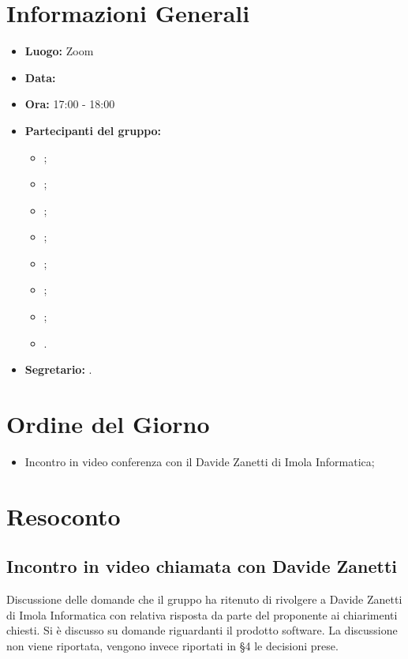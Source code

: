 \section{Informazioni Generali}
\begin{itemize}
	\item \textbf{Luogo:} Zoom
	\item \textbf{Data:} \Data
	\item \textbf{Ora:} 17:00 - 18:00
	\item \textbf{Partecipanti del gruppo:}
	\begin{itemize}
		\item \AT{};
		\item \BR{};  
		\item \CE{}; 
		\item \DF{};
		\item \LD{};
		\item \MC{};
		\item \PF{};
		\item \SE{}.
	\end{itemize} 
	\item \textbf{Segretario:} \BR{}.
\end{itemize}

\section{Ordine del Giorno}
\begin{itemize}
	\item Incontro in video conferenza con il Davide Zanetti di Imola Informatica{};
\end{itemize}

\section{Resoconto}

\subsection{Incontro in video chiamata con Davide Zanetti}
Discussione delle domande che il gruppo ha ritenuto di rivolgere a Davide Zanetti di Imola Informatica con relativa risposta da parte del proponente ai chiarimenti chiesti. Si è discusso su domande riguardanti il prodotto software.
La discussione non viene riportata, vengono invece riportati in §4 le decisioni prese.

\clearpage